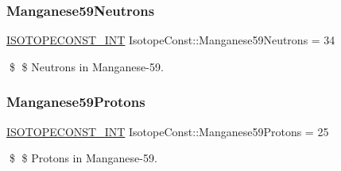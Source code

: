 \subsubsection{\texorpdfstring{Manganese59\+Neutrons}{Manganese59Neutrons}}
{\footnotesize\ttfamily \mbox{\hyperlink{group___isotope_const-_macros_ga5f18360b3e99483a35c32d789e62621c}{I\+S\+O\+T\+O\+P\+E\+C\+O\+N\+S\+T\+\_\+\+I\+NT}} Isotope\+Const\+::\+Manganese59\+Neutrons = 34}

\$ \$ Neutrons in Manganese-\/59. \mbox{\label{group___isotope_const-_manganese-_mn59_ga64c767aa5119c6fdddc52ca2874cd412}} 
\subsubsection{\texorpdfstring{Manganese59\+Protons}{Manganese59Protons}}
{\footnotesize\ttfamily \mbox{\hyperlink{group___isotope_const-_macros_ga5f18360b3e99483a35c32d789e62621c}{I\+S\+O\+T\+O\+P\+E\+C\+O\+N\+S\+T\+\_\+\+I\+NT}} Isotope\+Const\+::\+Manganese59\+Protons = 25}

\$ \$ Protons in Manganese-\/59. 